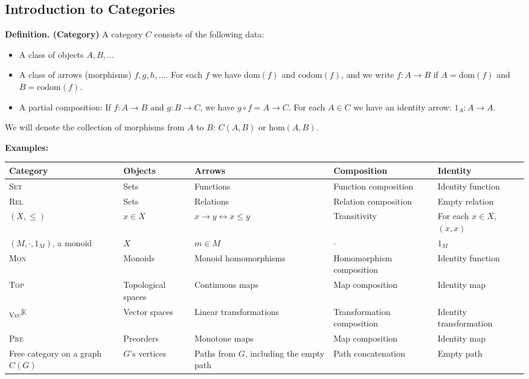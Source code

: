 \subsection{Introduction to Categories}
\textbf{Definition. (Category)} A category $C$ consists of the following data:
\begin{itemize}
\item A class of objects $A, B, ...$
\item A class of arrows (morphisms) $f, g, h, ...$. 
For each $f$ we have $\mathrm{dom}(f)$ and $\mathrm{codom}(f)$, and we write
$f: A \to B$ if $A = \mathrm{dom}(f)$ and $B = \mathrm{codom}(f)$.
\item A partial composition: If $f: A \to B$ and $g: B \to C$, we have 
$g \circ f = A \to C$.
For each $A \in C$ we have an identity arrow: $1_A : A \to A$.
\end{itemize}

We will denote the collection of morphisms from $A$ to $B$: $C(A, B)$ or $\mathrm{hom}(A, B)$.

\textbf{Examples:}
\begin{center}
\begin{tabular}{ |p{2cm}|p{2cm}|p{3cm}|p{3cm}|p{3cm}| } 
 \hline
 Category & Objects & Arrows & Composition & Identity\\ 
 \hline
 \hline
 \textsc{Set} & Sets & Functions & Function composition & Identity function\\ 
 \hline
 \textsc{Rel} & Sets & Relations & Relation composition & Empty relation\\
 \hline
 $(X, \leq)$ & $x\in X$ & $x \to y \leftrightarrow x \leq y $ & Transitivity & For each $x\in X$, $(x, x)$ \\
 \hline
 $(M, \cdot, 1_M)$, a monoid & ${X}$ & $m \in M$ & $\cdot$ & $1_M$ \\
 \hline
 \textsc{Mon} & Monoids & Monoid homomorphisms & Homomorphism composition & Identity function \\
 \hline
 \textsc{Top} & Topological spaces & Continuous maps & Map composition & Identity map \\
 \hline
 \textsubscript{\textsc{Vec}}{$\mathbb{K}$} & Vector spaces & Linear transformations & Transformation composition & Identity transformation \\
 \hline
 \textsc{Pre} & Preorders & Monotone maps & Map composition & Identity map \\
 Free category on a graph $C(G)$ & $G$'s vertices &Paths from $G$, including the empty path& Path concatenation & Empty path \\
 \hline
\end{tabular}
\end{center}

